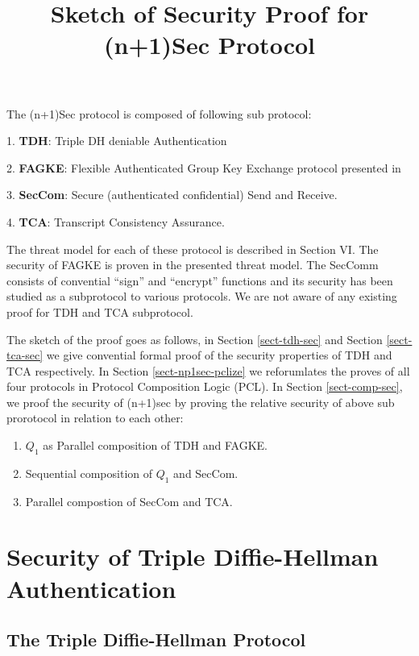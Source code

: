 \documentclass{article}
\newcommand{\tmstrong}[1]{\textbf{#1}}
\begin{document}
\title{Sketch of Security Proof for (n+1)Sec Protocol}

\maketitle

The (n+1)Sec protocol is composed of following sub protocol:
\begin{enumerate}
  1. {\tmstrong{TDH}}: Triple DH deniable Authentication
  
  2. {\tmstrong{FAGKE}}: Flexible Authenticated Group Key Exchange protocol
  presented in {\cite{AMP10}}
  
  3. {\tmstrong{SecCom}}: Secure (authenticated confidential) Send and
  Receive.
  
  4. {\tmstrong{TCA}}: Transcript Consistency Assurance.
\end{enumerate}
The threat model for each of these protocol is described in Section VI. The
security of FAGKE is proven in the presented threat model. The SecComm
consists of convential ``sign'' and ``encrypt'' functions and its security has
been studied as a subprotocol to various protocols. We are not aware of any
existing proof for TDH and TCA subprotocol.

The sketch of the proof goes as follows, in Section \ref{sect-tdh-sec} and
Section \ref{sect-tca-sec} we give convential formal proof of the security
properties of TDH and TCA respectively. In Section \ref{sect-np1sec-pclize} we
reforumlates the proves of all four protocols in Protocol Composition Logic
(PCL). In Section \ref{sect-comp-sec}, we proof the security of (n+1)sec by
proving the relative security of above sub prorotocol in relation to each
other:
\begin{enumerate}
  \item $Q_1$ as Parallel composition of TDH and FAGKE.
  
  \item Sequential composition of $Q_1$ and SecCom.
  
  \item  Parallel compostion of SecCom and TCA.
\end{enumerate}

\section{Security of Triple Diffie-Hellman Authentication}

\subsection{The Triple Diffie-Hellman Protocol}
\end{document}
